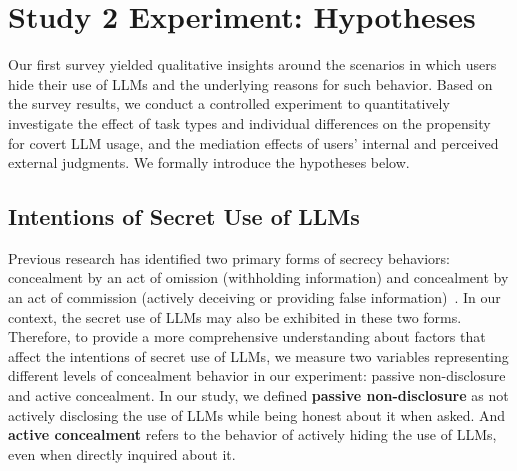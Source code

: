 \section{Study 2 Experiment: Hypotheses}

Our first survey yielded qualitative insights around the scenarios in which users hide their use of LLMs and the underlying reasons for such behavior.
Based on the survey results, we conduct a controlled experiment to quantitatively investigate the effect of task types and individual differences on the propensity for covert LLM usage, and the mediation effects of users' internal and perceived external judgments.
We formally introduce the hypotheses below.

\subsection{Intentions of Secret Use of LLMs}
Previous research has identified two primary forms of secrecy behaviors: concealment by an act of omission (withholding information) and concealment by an act of commission (actively deceiving or providing false information)~\cite{pennebaker1989confession, lane1995cognitive, kelly2002psychology, bok2011secrets}. 
In our context, the secret use of LLMs may also be exhibited in these two forms.
Therefore, to provide a more comprehensive understanding about factors that affect the intentions of secret use of LLMs, we measure two variables representing different levels of concealment behavior in our experiment: passive non-disclosure and active concealment.
In our study, we defined \textbf{passive non-disclosure} as not actively disclosing the use of LLMs while being honest about it when asked.
And \textbf{active concealment} refers to the behavior of actively hiding the use of LLMs, even when directly inquired about it.


